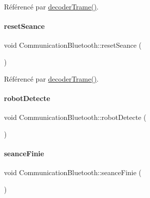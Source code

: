 Référencé par \hyperlink{class_communication_bluetooth_a6b53f12131d9323cec8f2a03fe716e6a}{decoder\+Trame()}.

\mbox{\label{class_communication_bluetooth_a1121bca5300f5bb1df09eb0378feeb0b}} 
\paragraph{\texorpdfstring{reset\+Seance}{resetSeance}}
{\footnotesize\ttfamily void Communication\+Bluetooth\+::reset\+Seance (\begin{DoxyParamCaption}{ }\end{DoxyParamCaption})\hspace{0.3cm}{\ttfamily [signal]}}



Référencé par \hyperlink{class_communication_bluetooth_a6b53f12131d9323cec8f2a03fe716e6a}{decoder\+Trame()}.

\mbox{\label{class_communication_bluetooth_ad70dc7bbbf69314ae8cd9cc6460a3690}} 
\paragraph{\texorpdfstring{robot\+Detecte}{robotDetecte}}
{\footnotesize\ttfamily void Communication\+Bluetooth\+::robot\+Detecte (\begin{DoxyParamCaption}{ }\end{DoxyParamCaption})\hspace{0.3cm}{\ttfamily [signal]}}

\mbox{\label{class_communication_bluetooth_aa35ab06e34cf7571c815f63af91c44a7}} 
\paragraph{\texorpdfstring{seance\+Finie}{seanceFinie}}
{\footnotesize\ttfamily void Communication\+Bluetooth\+::seance\+Finie (\begin{DoxyParamCaption}{ }\end{DoxyParamCaption})\hspace{0.3cm}{\ttfamily [signal]}}



